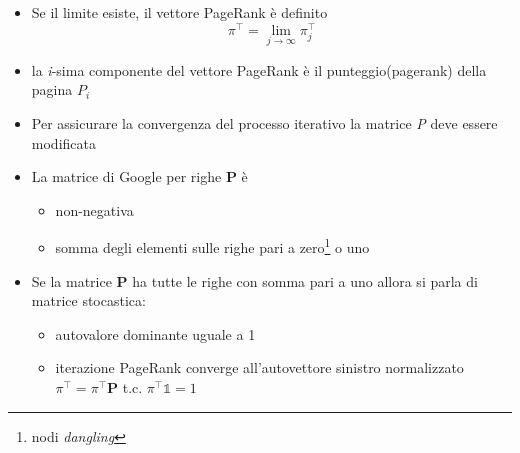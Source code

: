 \documentclass{beamer}
\begin{document}

\begin{frame}
	\begin{itemize}
		\item Se il limite esiste, il vettore PageRank è definito $$ \pi^\intercal = \lim_{j\to\infty}\pi_j^\intercal$$
		\item la \emph{i}-sima componente del vettore PageRank è il punteggio(pagerank) della pagina $P_i$
		\item Per assicurare la convergenza del processo iterativo la matrice \emph{P} deve essere modificata
	\end{itemize}
\end{frame}


\begin{frame}
	\begin{itemize}
		\item La matrice di Google per righe \textbf{P} è 
		\begin{itemize}
			\item non-negativa
			\item somma degli elementi sulle righe pari a zero\footnote{nodi \emph{dangling}} o uno
		\end{itemize}
		\item Se la matrice \textbf{P} ha tutte le righe con somma pari a uno allora si parla di matrice stocastica:
		\begin{itemize}
			\item autovalore dominante uguale a 1
			\item iterazione PageRank converge all'autovettore sinistro normalizzato $\pi^\intercal=\pi^\intercal \textbf{P}$ t.c. $\pi^\intercal \mathbb{1} = 1$
		\end{itemize}
	\end{itemize}
\end{frame}

\end{document}
